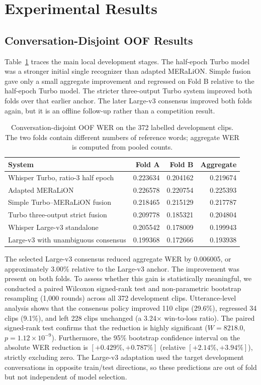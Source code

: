 \documentclass[journal]{IEEEtran}
\begin{document}
\section{Experimental Results}
\subsection{Conversation-Disjoint OOF Results}
Table~\ref{tab:oof} traces the main local development stages. The half-epoch Turbo model was a stronger initial single recognizer than adapted MERaLiON. Simple fusion gave only a small aggregate improvement and regressed on Fold B relative to the half-epoch Turbo model. The stricter three-output Turbo system improved both folds over that earlier anchor. The later Large-v3 consensus improved both folds again, but it is an offline follow-up rather than a competition result.

\begin{table}[!t]
\caption{Conversation-disjoint OOF WER on the 372 labelled development clips. The two folds contain different numbers of reference words; aggregate WER is computed from pooled counts.}
\label{tab:oof}
\centering
\footnotesize
\begin{tabular}{lrrr}
\toprule
System & Fold A & Fold B & Aggregate \\
\midrule
Whisper Turbo, ratio-3 half epoch & 0.223634 & 0.204162 & 0.219674 \\
Adapted MERaLiON & 0.226578 & 0.220754 & 0.225393 \\
Simple Turbo--MERaLiON fusion & 0.218465 & 0.215129 & 0.217787 \\
Turbo three-output strict fusion & 0.209778 & 0.185321 & 0.204804 \\
Whisper Large-v3 standalone & 0.205542 & 0.178009 & 0.199943 \\
Large-v3 with unambiguous consensus & 0.199368 & 0.172666 & 0.193938 \\
\bottomrule
\end{tabular}
\end{table}

The selected Large-v3 consensus reduced aggregate WER by 0.006005, or approximately 3.00\% relative to the Large-v3 anchor. The improvement was present on both folds. To assess whether this gain is statistically meaningful, we conducted a paired Wilcoxon signed-rank test and non-parametric bootstrap resampling (1,000 rounds) across all 372 development clips. Utterance-level analysis shows that the consensus policy improved 110 clips (29.6\%), regressed 34 clips (9.1\%), and left 228 clips unchanged (a 3.24$\times$ win-to-loss ratio). The paired signed-rank test confirms that the reduction is highly significant ($W = 8218.0$, $p = 1.12 \times 10^{-9}$). Furthermore, the 95\% bootstrap confidence interval on the absolute WER reduction is $[+0.429\%, +0.787\%]$ (relative $[+2.14\%, +3.94\%]$), strictly excluding zero. The Large-v3 adaptation used the target development conversations in opposite train/test directions, so these predictions are out of fold but not independent of model selection.
\end{document}
